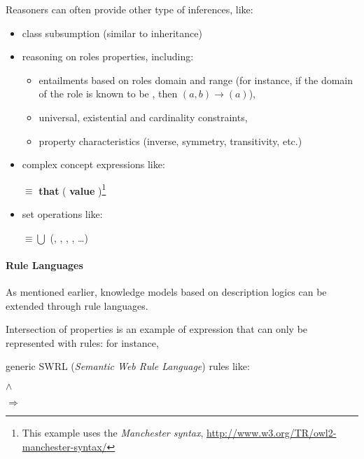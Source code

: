 Reasoners can often provide other type of inferences, like:

\begin{itemize}
    \item class subsumption (similar to inheritance)

    \item reasoning on roles properties, including:
        \begin{itemize}
        \item entailments based on roles domain and range (for instance, if the
        domain of the role  is known to be
        , then $(a, b) \to
        $$(a)$),

        \item universal, existential and cardinality constraints,

        \item property characteristics (inverse, symmetry, transitivity, etc.)

        \end{itemize}

    \item complex concept expressions like: \par \footnotesize {}
    $\equiv$  {\bf that} ( {\bf value}
    )\footnote{This example uses the \emph{Manchester
    syntax}, \url{http://www.w3.org/TR/owl2-manchester-syntax/}} \normalsize

    \item set operations like: \par \footnotesize {} $\equiv \bigcup$ (, , ,
    , \ldots) \normalsize

\end{itemize}

\paragraph{Rule Languages}

As mentioned earlier, knowledge models based on description logics can be extended through rule languages.

Intersection of properties is an example of expression that can only be represented with rules: for instance, 

generic SWRL ({\em Semantic Web Rule Language}) rules like: \par
        \footnotesize {} $\land$
         \par $\Rightarrow$ 
        \normalsize 


